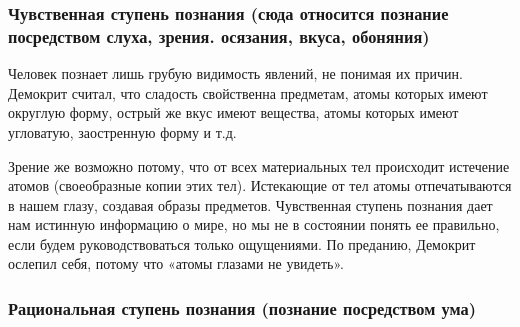 \documentclass[
]{article}
\begin{document}
\hypertarget{ux447ux443ux432ux441ux442ux432ux435ux43dux43dux430ux44f-ux441ux442ux443ux43fux435ux43dux44c-ux43fux43eux437ux43dux430ux43dux438ux44f-ux441ux44eux434ux430-ux43eux442ux43dux43eux441ux438ux442ux441ux44f-ux43fux43eux437ux43dux430ux43dux438ux435-ux43fux43eux441ux440ux435ux434ux441ux442ux432ux43eux43c-ux441ux43bux443ux445ux430-ux437ux440ux435ux43dux438ux44f.-ux43eux441ux44fux437ux430ux43dux438ux44f-ux432ux43aux443ux441ux430-ux43eux431ux43eux43dux44fux43dux438ux44f}{%
\subsubsection{Чувственная ступень познания (сюда относится познание
посредством слуха, зрения. осязания, вкуса,
обоняния)}\label{ux447ux443ux432ux441ux442ux432ux435ux43dux43dux430ux44f-ux441ux442ux443ux43fux435ux43dux44c-ux43fux43eux437ux43dux430ux43dux438ux44f-ux441ux44eux434ux430-ux43eux442ux43dux43eux441ux438ux442ux441ux44f-ux43fux43eux437ux43dux430ux43dux438ux435-ux43fux43eux441ux440ux435ux434ux441ux442ux432ux43eux43c-ux441ux43bux443ux445ux430-ux437ux440ux435ux43dux438ux44f.-ux43eux441ux44fux437ux430ux43dux438ux44f-ux432ux43aux443ux441ux430-ux43eux431ux43eux43dux44fux43dux438ux44f}}

Человек познает лишь грубую видимость явлений, не понимая их причин.
Демокрит считал, что сладость свойственна предметам, атомы которых имеют
округлую форму, острый же вкус имеют вещества, атомы которых имеют
угловатую, заостренную форму и т.д.

Зрение же возможно потому, что от всех материальных тел происходит
истечение атомов (своеобразные копии этих тел). Истекающие от тел атомы
отпечатываются в нашем глазу, создавая образы предметов. Чувственная
ступень познания дает нам истинную информацию о мире, но мы не в
состоянии понять ее правильно, если будем руководствоваться только
ощущениями. По преданию, Демокрит ослепил себя, потому что «атомы
глазами не увидеть».

\hypertarget{ux440ux430ux446ux438ux43eux43dux430ux43bux44cux43dux430ux44f-ux441ux442ux443ux43fux435ux43dux44c-ux43fux43eux437ux43dux430ux43dux438ux44f-ux43fux43eux437ux43dux430ux43dux438ux435-ux43fux43eux441ux440ux435ux434ux441ux442ux432ux43eux43c-ux443ux43cux430}{%
\subsubsection{Рациональная ступень познания (познание посредством
ума)}\label{ux440ux430ux446ux438ux43eux43dux430ux43bux44cux43dux430ux44f-ux441ux442ux443ux43fux435ux43dux44c-ux43fux43eux437ux43dux430ux43dux438ux44f-ux43fux43eux437ux43dux430ux43dux438ux435-ux43fux43eux441ux440ux435ux434ux441ux442ux432ux43eux43c-ux443ux43cux430}}
\end{document}
